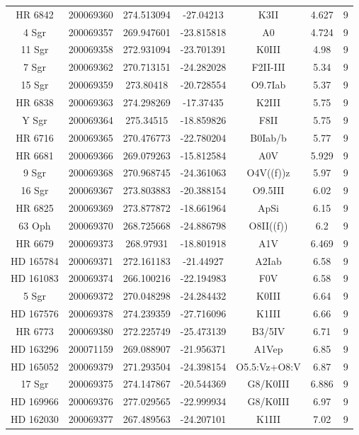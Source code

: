 \begin{table*}
\begin{tabular}{ccccccc}
HR 6842 & 200069360 & 274.513094 & -27.04213 & K3II & 4.627 & 9 \\
4 Sgr & 200069357 & 269.947601 & -23.815818 & A0 & 4.724 & 9 \\
11 Sgr & 200069358 & 272.931094 & -23.701391 & K0III & 4.98 & 9 \\
7 Sgr & 200069362 & 270.713151 & -24.282028 & F2II-III & 5.34 & 9 \\
15 Sgr & 200069359 & 273.80418 & -20.728554 & O9.7Iab & 5.37 & 9 \\
HR 6838 & 200069363 & 274.298269 & -17.37435 & K2III & 5.75 & 9 \\
Y Sgr & 200069364 & 275.34515 & -18.859826 & F8II & 5.75 & 9 \\
HR 6716 & 200069365 & 270.476773 & -22.780204 & B0Iab/b & 5.77 & 9 \\
HR 6681 & 200069366 & 269.079263 & -15.812584 & A0V & 5.929 & 9 \\
9 Sgr & 200069368 & 270.968745 & -24.361063 & O4V((f))z & 5.97 & 9 \\
16 Sgr & 200069367 & 273.803883 & -20.388154 & O9.5III & 6.02 & 9 \\
HR 6825 & 200069369 & 273.877872 & -18.661964 & ApSi & 6.15 & 9 \\
63 Oph & 200069370 & 268.725668 & -24.886798 & O8II((f)) & 6.2 & 9 \\
HR 6679 & 200069373 & 268.97931 & -18.801918 & A1V & 6.469 & 9 \\
HD 165784 & 200069371 & 272.161183 & -21.44927 & A2Iab & 6.58 & 9 \\
HD 161083 & 200069374 & 266.100216 & -22.194983 & F0V & 6.58 & 9 \\
5 Sgr & 200069372 & 270.048298 & -24.284432 & K0III & 6.64 & 9 \\
HD 167576 & 200069378 & 274.239359 & -27.716096 & K1III & 6.66 & 9 \\
HR 6773 & 200069380 & 272.225749 & -25.473139 & B3/5IV & 6.71 & 9 \\
HD 163296 & 200071159 & 269.088907 & -21.956371 & A1Vep & 6.85 & 9 \\
HD 165052 & 200069379 & 271.293504 & -24.398154 & O5.5:Vz+O8:V & 6.87 & 9 \\
17 Sgr & 200069375 & 274.147867 & -20.544369 & G8/K0III & 6.886 & 9 \\
HD 169966 & 200069376 & 277.029565 & -22.999934 & G8/K0III & 6.97 & 9 \\
HD 162030 & 200069377 & 267.489563 & -24.207101 & K1III & 7.02 & 9 \\

\end{tabular}
\end{table*}
